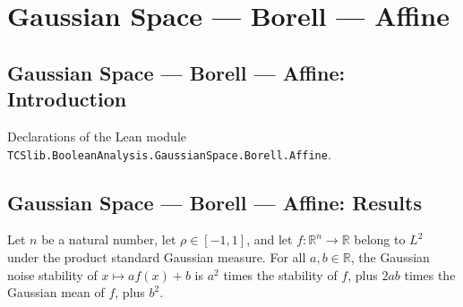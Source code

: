 \section{Gaussian Space --- Borell --- Affine}
\subsection*{Gaussian Space --- Borell --- Affine: Introduction}

Declarations of the Lean module \texttt{TCSlib.BooleanAnalysis.GaussianSpace.Borell.Affine}.

\subsection*{Gaussian Space --- Borell --- Affine: Results}

\begin{theorem}
\label{BooleanAnalysis.GaussianSpace.gaussianNoiseStability_affine}
\leanok
{}
Let $n$ be a natural number, let $\rho\in[-1,1]$, and let $f:\mathbb R^n\to\mathbb R$
belong to $L^2$ under the product standard Gaussian measure. For all $a,b\in\mathbb R$,
the Gaussian noise stability of $x\mapsto af(x)+b$ is $a^2$ times the stability of $f$,
plus $2ab$ times the Gaussian mean of $f$, plus $b^2$.
\end{theorem}
